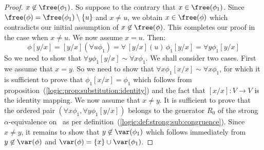 \begin{proof}
$x\not\in\free(\phi_{1})$. So suppose to the contrary that
$x\in\free(\phi_{1})$. Since
$\free(\phi)=\free(\phi_{1})\setminus\{u\}$ and $x\neq u$, we obtain
$x\in\free(\phi)$ which contradicts our initial assumption of
$x\not\in\free(\phi)$. This completes our proof in the case when
$x\neq u$. We now assume $x=u$. Then:
    \[
    \phi[y/x]=[y/x](\forall u\phi_{1})=\forall\,[y/x](u)\,\phi_{1}[y/x]=\forall y\phi_{1}[y/x]
    \]
So we need to show that $\forall y\phi_{1}[y/x]\sim\forall
x\phi_{1}$. We shall consider two cases. First we assume that $x=y$.
So we need to show that $\forall x\phi_{1}[x/x]\sim\forall
x\phi_{1}$, for which it is sufficient to prove that
$\phi_{1}[x/x]=\phi_{1}$ which follows from
proposition~(\ref{logic:prop:substitution:identity}) and the fact
that $[x/x]:V\to V$ is the identity mapping. We now assume that
$x\neq y$. It is sufficient to prove that the ordered pair $(\forall
x\phi_{1},\forall y\phi_{1}[y/x])$ belongs to the generator $R_{0}$
of the strong $\alpha$-equivalence on \pv\ as per
definition~(\ref{logic:def:strong:sub:congruence}). Since $x\neq y$,
it remains to show that $y\not\in\var(\phi_{1})$ which follows
immediately from $y\not\in\var(\phi)$ and
$\var(\phi)=\{x\}\cup\var(\phi_{1})$.
\end{proof}

